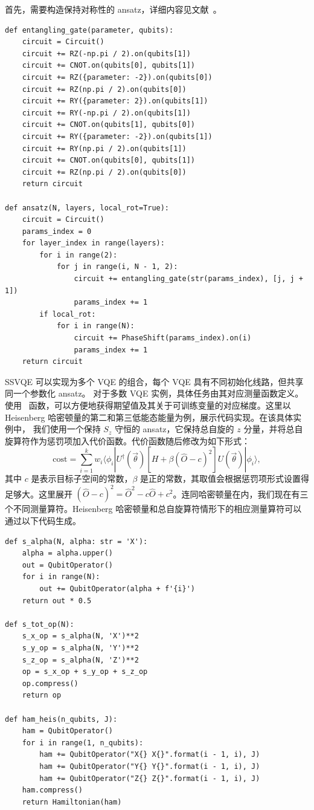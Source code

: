 首先，需要构造保持对称性的 ansatz，详细内容见文献~\cite{Lyu2023symmetryenhanced}。
\begin{lstlisting}
def entangling_gate(parameter, qubits):
    circuit = Circuit()
    circuit += RZ(-np.pi / 2).on(qubits[1])
    circuit += CNOT.on(qubits[0], qubits[1])
    circuit += RZ({parameter: -2}).on(qubits[0])
    circuit += RZ(np.pi / 2).on(qubits[0])
    circuit += RY({parameter: 2}).on(qubits[1])
    circuit += RY(-np.pi / 2).on(qubits[1])
    circuit += CNOT.on(qubits[1], qubits[0])
    circuit += RY({parameter: -2}).on(qubits[1])
    circuit += RY(np.pi / 2).on(qubits[1])
    circuit += CNOT.on(qubits[0], qubits[1])
    circuit += RZ(np.pi / 2).on(qubits[0])
    return circuit

def ansatz(N, layers, local_rot=True):
    circuit = Circuit()
    params_index = 0
    for layer_index in range(layers):
        for i in range(2):
            for j in range(i, N - 1, 2):
                circuit += entangling_gate(str(params_index), [j, j + 1])
                params_index += 1
        if local_rot:
            for i in range(N):
                circuit += PhaseShift(params_index).on(i)
                params_index += 1
    return circuit
\end{lstlisting}

SSVQE 可以实现为多个 VQE 的组合，每个 VQE 具有不同初始化线路，但共享同一个参数化 ansatz。
对于多数 VQE 实例，具体任务由其对应测量函数定义。
使用 \getexpectationwithgrad\ 函数，可以方便地获得期望值及其关于可训练变量的对应梯度。这里以 Heisenberg 哈密顿量的第二和第三低能态能量为例，展示代码实现。在该具体实例中，
我们使用一个保持 $S_z$ 守恒的 ansatz，它保持总自旋的 $z$ 分量，并将总自旋算符作为惩罚项加入代价函数。代价函数随后修改为如下形式：
\begin{equation}
    \mathrm{cost} = \sum_{i=1}^{k} w_{i} \langle \phi_{i}| U^{\dagger}(\vec{\theta}) [H + \beta(\hat{O} - c)^2] U(\vec{\theta}) | \phi_{i} \rangle,
    \label{ssvqe_cost_pen}
\end{equation}
其中 $c$ 是表示目标子空间的常数，$\beta$ 是正的常数，其取值会根据惩罚项形式设置得足够大。这里展开 $(\hat{O} - c)^2 {=} \hat{O}^2 {-} c\hat{O} {+} c^2$。连同哈密顿量在内，我们现在有三个不同测量算符。Heisenberg 哈密顿量和总自旋算符情形下的相应测量算符可以通过以下代码生成。

\begin{lstlisting}
def s_alpha(N, alpha: str = 'X'):
    alpha = alpha.upper()
    out = QubitOperator()
    for i in range(N):
        out += QubitOperator(alpha + f'{i}')
    return out * 0.5

def s_tot_op(N):
    s_x_op = s_alpha(N, 'X')**2
    s_y_op = s_alpha(N, 'Y')**2
    s_z_op = s_alpha(N, 'Z')**2
    op = s_x_op + s_y_op + s_z_op
    op.compress()
    return op

def ham_heis(n_qubits, J):
    ham = QubitOperator()
    for i in range(1, n_qubits):
        ham += QubitOperator("X{} X{}".format(i - 1, i), J)
        ham += QubitOperator("Y{} Y{}".format(i - 1, i), J)
        ham += QubitOperator("Z{} Z{}".format(i - 1, i), J)
    ham.compress()
    return Hamiltonian(ham)
\end{lstlisting}

